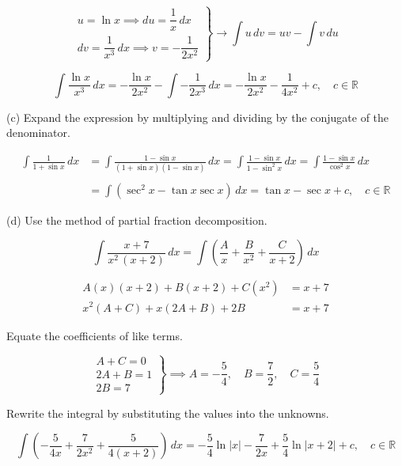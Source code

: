 \documentclass{article}
\begin{document}
\[\left.\begin{array}{c}
u=\ln x\implies du=\dfrac1x\,dx\\[1em]
dv=\dfrac1{x^3}\,dx\implies v=-\dfrac1{2x^2}
\end{array}\right\}\rightarrow \int u\,dv=uv-\int v\,du\]

\[\int\frac{\ln x}{x^3}\,dx=-\frac{\ln x}{2x^2}-\int-\frac1{2x^3}\,dx=\boxed{-\frac{\ln x}{2x^2}-\frac1{4x^2}+c,\quad c\in\mathbb{R}}\]

\hfill

\noindent (c) Expand the expression by multiplying and dividing by the conjugate of the denominator.

\begin{align*}\int\frac1{1+\sin x}\,dx&=\int\frac{1-\sin x}{(1+\sin x)(1-\sin x)}\,dx=\int\frac{1-\sin x}{1-\sin^2x}\,dx=\int\frac{1-\sin x}{\cos^2x}\,dx\\\\&=\int\left(\sec^2x-\tan x\sec x\right)\,dx=\boxed{\tan x-\sec x+c,\quad c\in\mathbb{R}}\end{align*}

\hfill

\noindent (d) Use the method of partial fraction decomposition.

\[\int\frac{x+7}{x^2\,(x+2)}\,dx=\int\left(\frac{A}{x}+\frac{B}{x^2}+\frac{C}{x+2}\right)\,dx\]

\[\begin{array}{rc}
A(x)(x+2)+B(x+2)+C\left(x^2\right)&=x+7\\
x^2(A+C)+x(2A+B)+2B&=x+7
\end{array}\]

\hfill

\noindent Equate the coefficients of like terms.

\[\left.\begin{array}{c}
A+C=0\\
2A+B=1\\
2B=7
\end{array}\right\}\implies A=-\dfrac54, \quad B=\dfrac72,\quad C=\dfrac54\]

\hfill

\noindent Rewrite the integral by substituting the values into the unknowns.

\[\int\left(-\frac5{4x}+\frac{7}{2x^2}+\frac5{4(x+2)}\right)\,dx=\boxed{-\frac{5}4\ln\left|x\right|-\frac7{2x}+\frac54\ln\left|x+2\right|+c,\quad c\in\mathbb{R}}\]

\hfill
\end{document}
